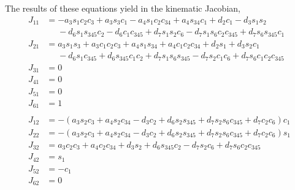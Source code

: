 \documentclass{article}
\begin{document}
The results of these equations yield in the kinematic Jacobian,
\begin{align*}
J_{11} &= - a_{3} s_{1} c_{2} c_{3} + a_{3} s_{3} c_{1} - a_{4} s_{1} c_{2} c_{34} + a_{4} s_{34} c_{1} + d_{2} c_{1} - d_{3} s_{1} s_{2} \\
       &\phantom{= }- d_{6} s_{1} s_{345} c_{2} - d_{6} c_{1} c_{345} + d_{7} s_{1} s_{2} c_{6} - d_{7} s_{1} s_{6} c_{2} c_{345} + d_{7} s_{6} s_{345} c_{1} \\
J_{21} &= a_{3} s_{1} s_{3} + a_{3} c_{1} c_{2} c_{3} + a_{4} s_{1} s_{34} + a_{4} c_{1} c_{2} c_{34} + d_{2} s_{1} + d_{3} s_{2} c_{1} \\
       &\phantom{= }- d_{6} s_{1} c_{345} + d_{6} s_{345} c_{1} c_{2} + d_{7} s_{1} s_{6} s_{345} - d_{7} s_{2} c_{1} c_{6} + d_{7} s_{6} c_{1} c_{2} c_{345} \\
J_{31} &= 0 \\
J_{41} &= 0 \\
J_{51} &= 0 \\
J_{61} &= 1 \\
\\
J_{12} &= - \left(a_{3} s_{2} c_{3} + a_{4} s_{2} c_{34} - d_{3} c_{2} + d_{6} s_{2} s_{345} + d_{7} s_{2} s_{6} c_{345} + d_{7} c_{2} c_{6}\right) c_{1} \\
J_{22} &= - \left(a_{3} s_{2} c_{3} + a_{4} s_{2} c_{34} - d_{3} c_{2} + d_{6} s_{2} s_{345} + d_{7} s_{2} s_{6} c_{345} + d_{7} c_{2} c_{6}\right) s_{1} \\
J_{32} &= a_{3} c_{2} c_{3} + a_{4} c_{2} c_{34} + d_{3} s_{2} + d_{6} s_{345} c_{2} - d_{7} s_{2} c_{6} + d_{7} s_{6} c_{2} c_{345} \\
J_{42} &= s_{1} \\
J_{52} &= - c_{1} \\
J_{62} &= 0
\end{align*}
\end{document}
